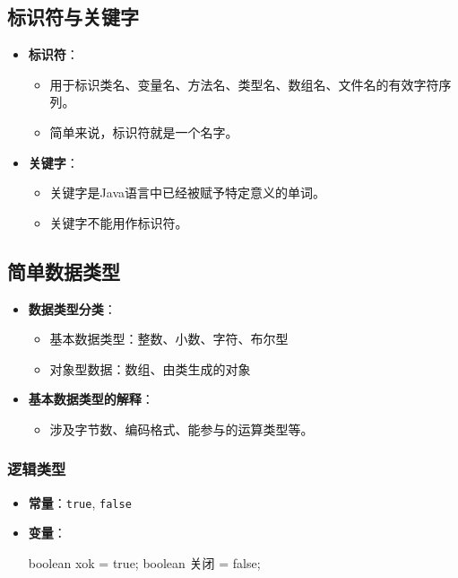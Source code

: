 \documentclass[a4paper, 10pt]{ctexart}
\begin{document}
\subsection{标识符与关键字}
\begin{itemize}
  \item \textbf{标识符}：
  \begin{itemize}
    \item 用于标识类名、变量名、方法名、类型名、数组名、文件名的有效字符序列。
    \item 简单来说，标识符就是一个名字。
  \end{itemize}
  \item \textbf{关键字}：
  \begin{itemize}
    \item 关键字是Java语言中已经被赋予特定意义的单词。
    \item 关键字不能用作标识符。
  \end{itemize}
\end{itemize}

\subsection{简单数据类型}
\begin{itemize}
  \item \textbf{数据类型分类}：
  \begin{itemize}
    \item 基本数据类型：整数、小数、字符、布尔型
    \item 对象型数据：数组、由类生成的对象
  \end{itemize}
  \item \textbf{基本数据类型的解释}：
  \begin{itemize}
    \item 涉及字节数、编码格式、能参与的运算类型等。
  \end{itemize}
\end{itemize}

\subsubsection{逻辑类型}
\begin{itemize}
  \item \textbf{常量}：\texttt{true}, \texttt{false}
  \item \textbf{变量}：
  \begin{codeblock}
boolean xok = true;
boolean 关闭 = false;
  \end{codeblock}
\end{itemize}
\end{document}
